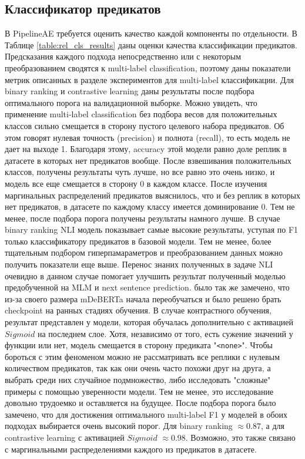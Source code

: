 \subsection{Классификатор предикатов}
В PipelineAE требуется оценить качество каждой компоненты по отдельности. В Таблице \ref{table:rel_cls_results} даны оценки качества классификации предикатов. Предсказания каждого подхода непосредственно или с некоторым преобразованием сводятся к multi-label classification, поэтому даны показатели метрик описанных в разделе экспериментов для multi-label классификации. Для binary ranking и contrastive learning даны результаты после подбора оптимального порога на валидационной выборке. Можно увидеть, что применение multi-label classification без подбора весов для положительных классов сильно смещается в сторону пустого целевого набора предикатов. Об этом говорят нулевая точность (precision) и полнота (recall), то есть модель не дает на выходе 1. Благодаря этому, accuracy этой модели равно доле реплик в датасете в которых нет предикатов вообще. После взвешивания положительных классов, получены результаты чуть лучше, но все равно это очень низко, и модель все еще смещается в сторону 0 в каждом классе. После изучения маргинальных распределений предикатов выяснилось, что и без реплик в которых нет предикатов, в датасете по каждому классу имеется доминирование 0. Тем не менее, после подбора порога получены результаты намного лучше. В случае binary ranking NLI модель показывает самые высокие результаты, уступая по F1 только классификатору предикатов в базовой модели. Тем не менее, более тщательным подбором гиперпамараметров и преобразованием данных можно получить показатели еще выше. Перенос знаних полученных в задаче NLI очевидно в данном случае помогает улучшить результат полученный моделью предобученной на MLM и next sentence prediction. было так же замечено, что из-за своего размера mDeBERTa начала переобучаться и было решено брать checkpoint на ранных стадиях обучения. В случае контрастного обучения, результат представлен у модели, которая обучалась дополнительно с активацией $Sigmoid$ на последнем слое. Хотя, независимо от того, есть сужение значений у функции или нет, модель смещается в сторону предиката "\texttt{<none>}". Чтобы бороться с этим феноменом можно не рассматривать все реплики с нулевым количеством предикатов, так как они очень часто похожи друг на друга, а выбрать среди них случайное подмножество, либо исследовать "сложные" примеры с помощью уверенности модели. Тем не менее, это исследование довольно трудоемко и оставляется на будущее. После подбора порога было замечено, что для достижения оптимального multi-label F1 у моделей в обоих подходах выбирается очень высокий порог. Для binary ranking $\approx 0.87$, а для contrastive learning с активацией $Sigmoid$ $\approx 0.98$. Возможно, это также связано с маргинальными распределениями каждого из предикатов в датасете.

